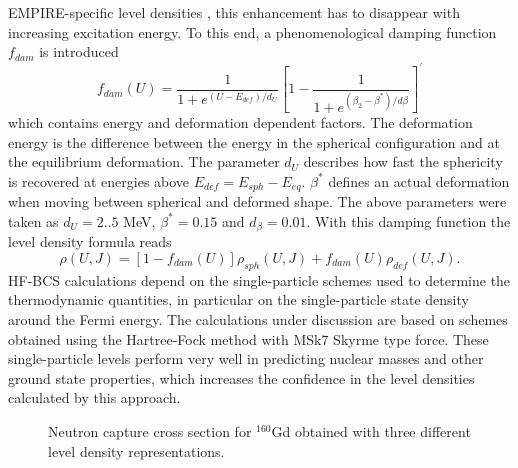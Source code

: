 EMPIRE-specific level densities%
, this enhancement has to disappear with increasing
excitation energy. To this end, a phenomenological damping function $f_{dam}$
is introduced
\begin{equation}
f_{dam}(U)=%
\frac{1}{1+e^{(U-E_{def})/d_{U}}}\left[1-\frac{1}{1+e^{(\beta_{2}-%
\beta^{*})/d\beta}}\right]^{\prime}  \label{dampgor}
\end{equation}
which contains energy and deformation dependent factors. The deformation
energy is the difference between the energy in the spherical configuration
and at the equilibrium deformation. The parameter $d_{U}$ describes how fast
the sphericity is recovered at energies above $E_{def}=E_{sph}-E_{eq}$. $%
\beta^{*}$ defines an actual deformation when moving between spherical and
deformed shape. The above parameters were taken as $d_{U}=2..5$ MeV, $%
\beta^{*}=0.15$ and $d_{\beta}=0.01$. With this damping function the level
density%
 formula reads
\begin{equation}
\rho(U,J)=\left[1-f_{dam}(U)\right]\rho_{sph}(U,J)+f_{dam}(U)\rho_{def}(U,J).
\label{rogor}
\end{equation}
HF-BCS%
 calculations depend on the single-particle schemes used to
determine the thermodynamic quantities, in particular on the single-particle
state density around the Fermi energy. The calculations under discussion are
based on schemes obtained using the Hartree-Fock method with MSk7 Skyrme
type force. These single-particle levels perform very well in predicting
nuclear masses and other ground state properties, which increases the
confidence in the level densities%
 calculated by this approach.
\begin{figure}[htbp]
\caption{Neutron capture cross section for $^{160}$Gd obtained with three
different level density representations.}
\label{levdens}
\end{figure}

